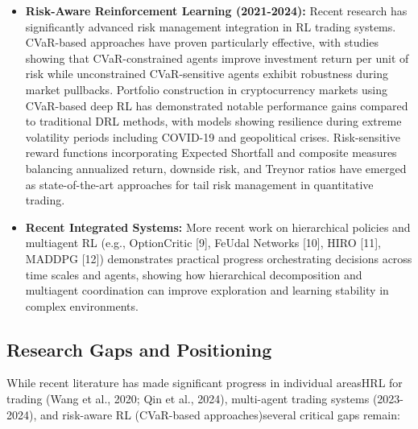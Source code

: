 \documentclass[11pt]{article}
\begin{document}
\begin{itemize}
\item   \textbf{Risk-Aware Reinforcement Learning (2021-2024):} Recent research has significantly advanced risk management integration in RL trading systems. CVaR-based approaches have proven particularly effective, with studies showing that CVaR-constrained agents improve investment return per unit of risk while unconstrained CVaR-sensitive agents exhibit robustness during market pullbacks. Portfolio construction in cryptocurrency markets using CVaR-based deep RL has demonstrated notable performance gains compared to traditional DRL methods, with models showing resilience during extreme volatility periods including COVID-19 and geopolitical crises. Risk-sensitive reward functions incorporating Expected Shortfall and composite measures balancing annualized return, downside risk, and Treynor ratios have emerged as state-of-the-art approaches for tail risk management in quantitative trading.

\item   \textbf{Recent Integrated Systems:} More recent work on hierarchical policies and multiagent RL (e.g., OptionCritic [9], FeUdal Networks [10], HIRO [11], MADDPG [12]) demonstrates practical progress orchestrating decisions across time scales and agents, showing how hierarchical decomposition and multiagent coordination can improve exploration and learning stability in complex environments.

\end{itemize}
\subsection{Research Gaps and Positioning}

While recent literature has made significant progress in individual areasHRL for trading (Wang et al., 2020; Qin et al., 2024), multi-agent trading systems (2023-2024), and risk-aware RL (CVaR-based approaches)several critical gaps remain:
\end{document}
